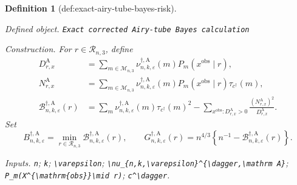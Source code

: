 \documentclass{article}
\newtheorem{definition}{Definition}
\begin{document}
\begin{definition}[def:exact-airy-tube-bayes-risk]\label{def:exact-airy-tube-bayes-risk}
\par\smallskip\noindent\emph{Defined object.} \texttt{Exact corrected Airy-\allowbreak{}tube Bayes calculation}
\par\smallskip\noindent\emph{Construction.} For \(r\in\mathcal R_{n,3}\), define
\[
\begin{aligned}
D^{\mathrm A}_{r,x}
&=\sum_{m\in\mathcal M_{n,3}}
 \nu_{n,k,\varepsilon}^{\dagger,\mathrm A}(m)
 P_m(x^{\mathrm{obs}}\mid r),\\
N^{\mathrm A}_{r,x}
&=\sum_{m\in\mathcal M_{n,3}}
 \nu_{n,k,\varepsilon}^{\dagger,\mathrm A}(m)
 P_m(x^{\mathrm{obs}}\mid r)\tau_{c^\dagger}(m),\\
\mathcal B_{n,k,\varepsilon}^{\dagger,\mathrm A}(r)
&=\sum_m\nu_{n,k,\varepsilon}^{\dagger,\mathrm A}(m)
 \tau_{c^\dagger}(m)^2
 -\sum_{x^{\mathrm{obs}}:D^{\mathrm A}_{r,x}>0}
 \frac{(N^{\mathrm A}_{r,x})^2}{D^{\mathrm A}_{r,x}}.
\end{aligned}
\]
Set
\[
B_{n,k,\varepsilon}^{\dagger,\mathrm A}
=\min_{r\in\mathcal R_{n,3}}
 \mathcal B_{n,k,\varepsilon}^{\dagger,\mathrm A}(r),
\qquad
G_{n,k,\varepsilon}^{\dagger,\mathrm A}(r)
=n^{4/3}\left\{n^{-1}
 -\mathcal B_{n,k,\varepsilon}^{\dagger,\mathrm A}(r)\right\}.
\]
\par\smallskip\noindent\emph{Inputs.} \texttt{n}; \texttt{k}; \texttt{\textbackslash{}\allowbreak{}varepsilon}; \texttt{\textbackslash{}\allowbreak{}nu\_\allowbreak{}\{n,\allowbreak{}k,\allowbreak{}\textbackslash{}\allowbreak{}varepsilon\}\allowbreak{}\textasciicircum{}\{\textbackslash{}\allowbreak{}dagger,\allowbreak{}\textbackslash{}\allowbreak{}mathrm A\}\allowbreak{}}; \texttt{P\_\allowbreak{}m(X\textasciicircum{}\{\textbackslash{}\allowbreak{}mathrm\{obs\}\allowbreak{}\}\allowbreak{}\textbackslash{}\allowbreak{}mid r)}; \texttt{c\textasciicircum{}\textbackslash{}\allowbreak{}dagger}.
\end{definition}
\end{document}
